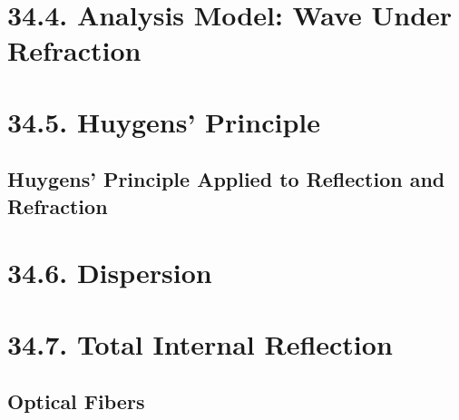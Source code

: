 \documentclass[12pt, letterpaper]{article}
\begin{document}
\section*{34.4. Analysis Model: Wave Under Refraction}

\section*{34.5. Huygens' Principle}

\subsection*{Huygens' Principle Applied to Reflection and Refraction}

\section*{34.6. Dispersion}

\section*{34.7. Total Internal Reflection}

\subsection*{Optical Fibers}
\end{document}
